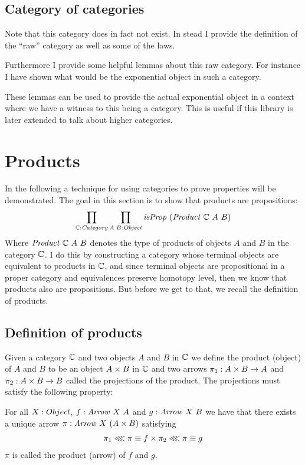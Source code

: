 \subsection{Category of categories}
Note that this category does in fact not exist. In stead I provide the
definition of the ``raw'' category as well as some of the laws.

Furthermore I provide some helpful lemmas about this raw category. For instance
I have shown what would be the exponential object in such a category.

These lemmas can be used to provide the actual exponential object in a context
where we have a witness to this being a category. This is useful if this library
is later extended to talk about higher categories.

\section{Products}
\label{sec:products}
In the following a technique for using categories to prove properties will be
demonstrated. The goal in this section is to show that products are
propositions:
%
$$
\prod_{\bC \tp \Category} \prod_{A\;B \tp \Object} \isProp\ (\var{Product}\ \bC\ A\ B)
$$
%
Where $\mathit{Product}\ \mathbb{C}\ A\ B$ denotes the type of products of objects $A$
and $B$ in the category $\mathbb{C}$. I do this by constructing a category whose
terminal objects are equivalent to products in $\mathbb{C}$, and since terminal objects
are propositional in a proper category and equivalences preserve homotopy level,
then we know that products also are propositions. But before we get to that,
we recall the definition of products.

\subsection{Definition of products}
Given a category $\mathbb{C}$ and two objects $A$ and $B$ in $\mathbb{C}$ we define the
product (object) of $A$ and $B$ to be an object $A \times B$ in $\mathbb{C}$ and two arrows
$\pi_1 \mathrel{:} A \times B \to A$ and $\pi_2 \mathrel{:} A \times B \to B$ called the projections of
the product. The projections must satisfy the following property:

For all $X \mathrel{:} Object$, $f \tp \Arrow\ X\ A$ and $g \tp \Arrow\ X\ B$ we have
that there exists a unique arrow $\pi \tp \Arrow\ X\ (A \x B)$ satisfying
%
\begin{align}
\label{eq:umpProduct}
\pi_1 \lll \pi \equiv f \times \pi_2 \lll \pi \equiv g
\end{align}
%
$\pi$ is called the product (arrow) of $f$ and $g$.

